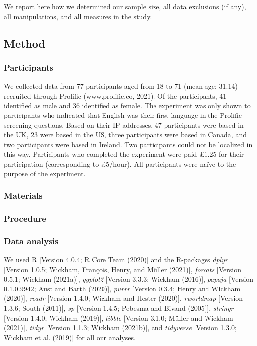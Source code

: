 \documentclass[
  english,
  man]{apa6}
\begin{document}
We report here how we determined our sample size, all data exclusions (if any), all manipulations, and all measures in the study.

\hypertarget{method}{%
\subsection{Method}\label{method}}

\hypertarget{participants}{%
\subsubsection{Participants}\label{participants}}

We collected data from 77 participants aged from 18 to 71 (mean age: 31.14) recruited through Prolific (www.prolific.co, 2021). Of the participants, 41 identified as male and 36 identified as female. The experiment was only shown to participants who indicated that English was their first language in the Prolific screening questions. Based on their IP addresses, 47 participants were based in the UK, 23 were based in the US, three participants were based in Canada, and two participants were based in Ireland. Two participants could not be localized in this way. Participants who completed the experiment were paid £1.25 for their participation (corresponding to £5/hour). All participants were naïve to the purpose of the experiment.

\hypertarget{materials}{%
\subsubsection{Materials}\label{materials}}

\hypertarget{procedure}{%
\subsubsection{Procedure}\label{procedure}}

\hypertarget{data-analysis}{%
\subsubsection{Data analysis}\label{data-analysis}}

We used R {[}Version 4.0.4; R Core Team (2020){]} and the R-packages \emph{dplyr} {[}Version 1.0.5; Wickham, François, Henry, and Müller (2021){]}, \emph{forcats} {[}Version 0.5.1; Wickham (2021a){]}, \emph{ggplot2} {[}Version 3.3.3; Wickham (2016){]}, \emph{papaja} {[}Version 0.1.0.9942; Aust and Barth (2020){]}, \emph{purrr} {[}Version 0.3.4; Henry and Wickham (2020){]}, \emph{readr} {[}Version 1.4.0; Wickham and Hester (2020){]}, \emph{rworldmap} {[}Version 1.3.6; South (2011){]}, \emph{sp} {[}Version 1.4.5; Pebesma and Bivand (2005){]}, \emph{stringr} {[}Version 1.4.0; Wickham (2019){]}, \emph{tibble} {[}Version 3.1.0; Müller and Wickham (2021){]}, \emph{tidyr} {[}Version 1.1.3; Wickham (2021b){]}, and \emph{tidyverse} {[}Version 1.3.0; Wickham et al. (2019){]} for all our analyses.
\end{document}

